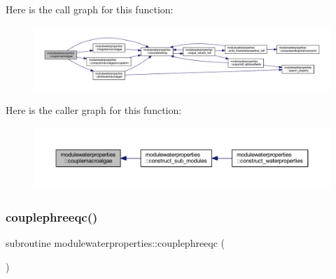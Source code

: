 Here is the call graph for this function\+:\nopagebreak
\begin{figure}[H]
\begin{center}
\leavevmode
\includegraphics[width=350pt]{namespacemodulewaterproperties_a2eeb2f2e0e29e2293f16af83dcbe02bb_cgraph}
\end{center}
\end{figure}
Here is the caller graph for this function\+:\nopagebreak
\begin{figure}[H]
\begin{center}
\leavevmode
\includegraphics[width=350pt]{namespacemodulewaterproperties_a2eeb2f2e0e29e2293f16af83dcbe02bb_icgraph}
\end{center}
\end{figure}
\mbox{\label{namespacemodulewaterproperties_a191c738815d3d3376105cfd51b26b59d}} 
\subsubsection{\texorpdfstring{couplephreeqc()}{couplephreeqc()}}
{\footnotesize\ttfamily subroutine modulewaterproperties\+::couplephreeqc (\begin{DoxyParamCaption}{ }\end{DoxyParamCaption})\hspace{0.3cm}{\ttfamily [private]}}


